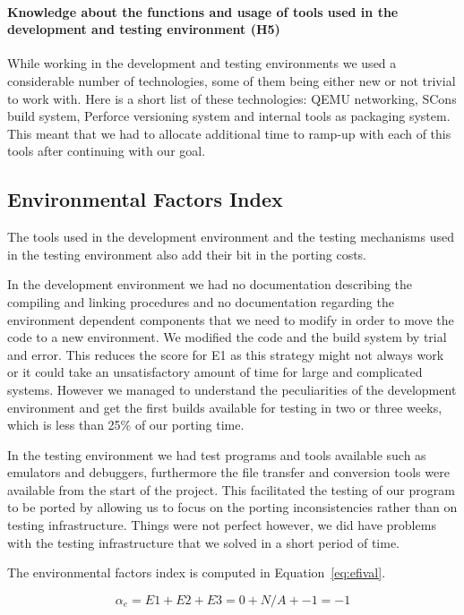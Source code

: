 \paragraph{Knowledge about the functions and usage of tools used in the development
and testing environment (H5)}
While working in the development and testing environments we used a considerable
number of technologies, some of them being either new or not trivial to work
with. Here is a short list of these technologies: QEMU networking, SCons build
system, Perforce versioning system and internal tools as packaging system. This
meant that we had to allocate additional time to ramp-up with each of this tools
after continuing with our goal.

\subsection{Environmental Factors Index}

The tools used in the development environment and the testing mechanisms used in
the testing environment also add their bit in the porting costs.

In the development environment we had no documentation describing the compiling
and linking procedures and no documentation regarding the environment dependent
components that we need to modify in order to move the code to a new
environment. We modified the code and the build system by trial and error. This
reduces the score for E1 as this strategy might not always work or it could take
an unsatisfactory amount of time for large and complicated systems. However
we managed to understand the peculiarities of the development environment and
get the first builds available for testing in two or three weeks, which is less
than 25\% of our porting time.

In the testing environment we had test programs and tools available such as
emulators and debuggers, furthermore the file transfer and conversion tools
were available from the start of the project. This facilitated the testing of
our program to be ported by allowing us to focus on the porting inconsistencies
rather than on testing infrastructure. Things were not perfect however, we did
have problems with the testing infrastructure that we solved in a short period
of time.

The environmental factors index is computed in Equation~\ref{eq:efival}.

\begin{equation} \label{eq:efival}
\alpha_e = E1 + E2 + E3 = 0 + N/A + -1 = -1
\end{equation}

